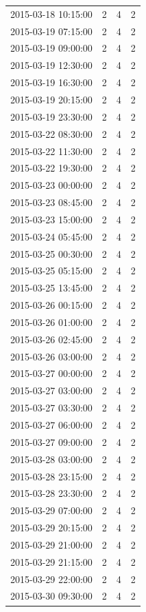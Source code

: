 \begin{tabular}{lrrr}
2015-03-18 10:15:00 & 2 & 4 & 2 \\
2015-03-19 07:15:00 & 2 & 4 & 2 \\
2015-03-19 09:00:00 & 2 & 4 & 2 \\
2015-03-19 12:30:00 & 2 & 4 & 2 \\
2015-03-19 16:30:00 & 2 & 4 & 2 \\
2015-03-19 20:15:00 & 2 & 4 & 2 \\
2015-03-19 23:30:00 & 2 & 4 & 2 \\
2015-03-22 08:30:00 & 2 & 4 & 2 \\
2015-03-22 11:30:00 & 2 & 4 & 2 \\
2015-03-22 19:30:00 & 2 & 4 & 2 \\
2015-03-23 00:00:00 & 2 & 4 & 2 \\
2015-03-23 08:45:00 & 2 & 4 & 2 \\
2015-03-23 15:00:00 & 2 & 4 & 2 \\
2015-03-24 05:45:00 & 2 & 4 & 2 \\
2015-03-25 00:30:00 & 2 & 4 & 2 \\
2015-03-25 05:15:00 & 2 & 4 & 2 \\
2015-03-25 13:45:00 & 2 & 4 & 2 \\
2015-03-26 00:15:00 & 2 & 4 & 2 \\
2015-03-26 01:00:00 & 2 & 4 & 2 \\
2015-03-26 02:45:00 & 2 & 4 & 2 \\
2015-03-26 03:00:00 & 2 & 4 & 2 \\
2015-03-27 00:00:00 & 2 & 4 & 2 \\
2015-03-27 03:00:00 & 2 & 4 & 2 \\
2015-03-27 03:30:00 & 2 & 4 & 2 \\
2015-03-27 06:00:00 & 2 & 4 & 2 \\
2015-03-27 09:00:00 & 2 & 4 & 2 \\
2015-03-28 03:00:00 & 2 & 4 & 2 \\
2015-03-28 23:15:00 & 2 & 4 & 2 \\
2015-03-28 23:30:00 & 2 & 4 & 2 \\
2015-03-29 07:00:00 & 2 & 4 & 2 \\
2015-03-29 20:15:00 & 2 & 4 & 2 \\
2015-03-29 21:00:00 & 2 & 4 & 2 \\
2015-03-29 21:15:00 & 2 & 4 & 2 \\
2015-03-29 22:00:00 & 2 & 4 & 2 \\
2015-03-30 09:30:00 & 2 & 4 & 2 \\

\end{tabular}
